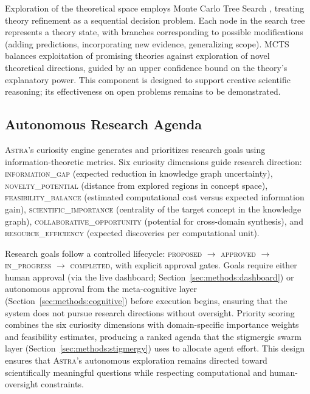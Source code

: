 \documentclass[usenatbib]{rasti}
\newcommand{\astra}{\textsc{Astra}\xspace}
\begin{document}
Exploration of the theoretical space employs Monte Carlo Tree Search \citep[MCTS;][]{Kocsis2006}, treating theory refinement as a sequential decision problem.
Each node in the search tree represents a theory state, with branches corresponding to possible modifications (adding predictions, incorporating new evidence, generalizing scope).
MCTS balances exploitation of promising theories against exploration of novel theoretical directions, guided by an upper confidence bound on the theory's explanatory power.
This component is designed to support creative scientific reasoning; its effectiveness on open problems remains to be demonstrated.

\subsection{Autonomous Research Agenda}
\label{sec:methods:agenda}

\astra's curiosity engine generates and prioritizes research goals using information-theoretic metrics.
Six curiosity dimensions guide research direction: \textsc{information\_gap} (expected reduction in knowledge graph uncertainty), \textsc{novelty\_potential} (distance from explored regions in concept space), \textsc{feasibility\_balance} (estimated computational cost versus expected information gain), \textsc{scientific\_importance} (centrality of the target concept in the knowledge graph), \textsc{collaborative\_opportunity} (potential for cross-domain synthesis), and \textsc{resource\_efficiency} (expected discoveries per computational unit).

Research goals follow a controlled lifecycle: \textsc{proposed} $\rightarrow$ \textsc{approved} $\rightarrow$ \textsc{in\_progress} $\rightarrow$ \textsc{completed}, with explicit approval gates.
Goals require either human approval (via the live dashboard; Section~\ref{sec:methods:dashboard}) or autonomous approval from the meta-cognitive layer (Section~\ref{sec:methods:cognitive}) before execution begins, ensuring that the system does not pursue research directions without oversight.
Priority scoring combines the six curiosity dimensions with domain-specific importance weights and feasibility estimates, producing a ranked agenda that the stigmergic swarm layer (Section~\ref{sec:methods:stigmergy}) uses to allocate agent effort.
This design ensures that \astra's autonomous exploration remains directed toward scientifically meaningful questions while respecting computational and human-oversight constraints.
\end{document}
